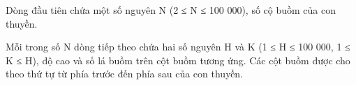 Dòng đầu tiên chứa một số nguyên N (2 ≤ N ≤ 100 000), số cộ buồm của con thuyền.  

   Mỗi trong số N dòng tiếp theo chứa hai số nguyên H và K (1 ≤ H ≤ 100 000, 1 ≤ K ≤ H), độ cao và số lá buồm trên cột buồm tương ứng. Các cột buồm được cho theo thứ tự từ phía trước đến phía sau của con thuyền.